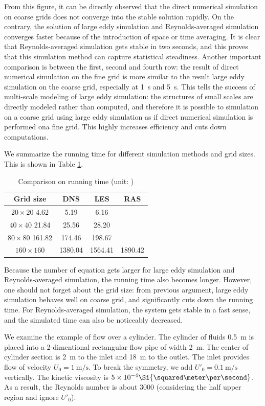 \documentclass[english, nochinese]{pkupaper}
\begin{document}
From this figure, it can be directly observed that the direct numerical simulation on coarse grids does not converge into the stable solution rapidly. On the contrary, the solution of large eddy simulation and Reynolds-averaged simulation converges faster because of the introduction of space or time averaging. It is clear that Reynolds-averaged simulation gets stable in two seconds, and this proves that this simulation method can capture statistical steadiness. Another important comparison is between the first, second and fourth row: the result of direct numerical simulation on the fine grid is more similar to the result large eddy simulation on the coarse grid, especially at \SI{1}{\second} and \SI{5}{\second}. This tells the success of multi-scale modeling of large eddy simulation: the structures of small scales are directly modeled rather than computed, and therefore it is possible to simulation on a coarse grid using large eddy simulation as if direct numerical simulation is performed ona fine grid. This highly increases efficiency and cuts down computations.

We summarize the running time for different simulation methods and grid sizes. This is shown in Table \ref{Tbl:Run}.

\begin{table}
\centering
\caption{Comparison on running time (unit: \Si{\second})}
\label{Tbl:Run}
\begin{tabular}{|c|c|c|c|}
\hline
Grid size & DNS & LES & RAS \\
\hline
$ 20 \times 20 $ 4.62 & 5.19 & 6.16 \\
\hline
$ 40 \times 40 $ 21.84 & 25.56 & 28.20 \\
\hline
$ 80 \times 80 $ 161.82 & 174.46 & 198.67 \\
\hline
$ 160 \times 160 $ & 1380.04 & 1564.41 & 1890.42 \\
\hline
\end{tabular}
\end{table}

Because the number of equation gets larger for large eddy simulation and Reynolds-averaged simulation, the running time also becomes longer. However, one should not forget about the grid size: from previous argument, large eddy simulation behaves well on coarse grid, and significantly cuts down the running time. For Reynolds-averaged simulation, the system gets stable in a fast sense, and the simulated time can also be noticeably decreased.

We examine the example of flow over a cylinder. The cylinder of fluids \SI{0.5}{\meter} is placed into a 2-dimentional rectangular flow pipe of width \SI{2}{\meter}. The center of cylinder section is \SI{2}{\meter} to the inlet and \SI{18}{\meter} to the outlet. The inlet provides flow of velocity $ U_0 = \SI{1}{\meter\per\second} $. To break the symmetry, we add $ U'_0 = \SI{0.1}{\meter\per\second} $ vertically. The kinetic viscosity is $ 5 \times 10^{-4} \Si{\squared\meter\per\second} $. As a result, the Reynolds number is about 3000 (considering the half upper region and ignore $U'_0$).
\end{document}
